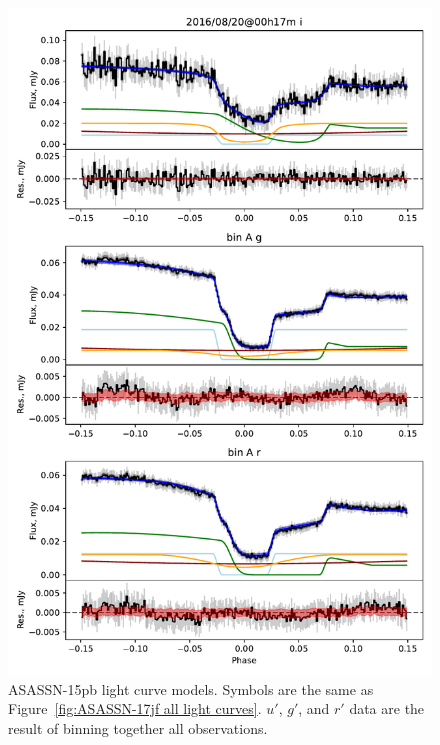 \begin{figure}
    \centering
    \includegraphics[width=\textwidth]{figures/results/ASASSN-15pb/ASASSN-15pb_1.pdf}
    \caption{ASASSN-15pb light curve models. Symbols are the same as Figure~\ref{fig:ASASSN-17jf all light curves}. $u'$, $g'$, and $r'$ data are the result of binning together all observations.}
    \label{fig:ASASSN-15pb all light curves}
\end{figure}
